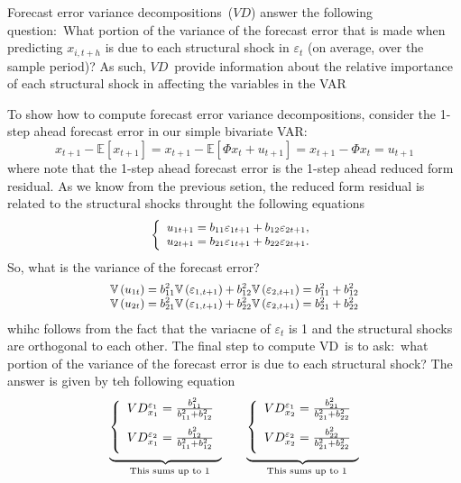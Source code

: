 \documentclass[10pt]{article}
\begin{document}
Forecast error variance decompositions\ ($VD$) answer the following
question:\ What portion of the variance of the forecast error that is made
when predicting $x_{i,t+h}$ is due to each structural shock in $\varepsilon
_{t}$ (on average, over the sample period)? As such, $VD$\ provide
information about the relative importance of each structural shock in
affecting the variables in the VAR

To show how to compute forecast error variance decompositions, consider the
1-step ahead forecast error in our simple bivariate VAR:%
\begin{equation*}
x_{t+1}-\mathbb{E}\left[ x_{t+1}\right] =x_{t+1}-\mathbb{E}\left[ \Phi
x_{t}+u_{t+1}\right] =x_{t+1}-\Phi x_{t}=u_{t+1}
\end{equation*}%
where note that the 1-step ahead forecast error is the 1-step ahead reduced
form residual. As we know from the previous setion, the reduced form
residual is related to the structural shocks throught the following equations%
\begin{equation*}
{\small \left\{ 
\begin{array}{c}
u_{1t+1}=b_{11}\varepsilon _{1t+1}+b_{12}\varepsilon _{2t+1}, \\ 
u_{2t+1}=b_{21}\varepsilon _{1t+1}+b_{22}\varepsilon _{2t+1}.%
\end{array}%
\right. }
\end{equation*}%
So, what is the variance of the forecast error?%
\begin{equation*}
{\small 
\begin{array}{c}
\mathbb{V}\left( u_{1t}\right) =b_{11}^{2}\mathbb{V}\left( \varepsilon
_{1,t+1}\right) +b_{12}^{2}\mathbb{V}\left( \varepsilon _{2,t+1}\right)
=b_{11}^{2}+b_{12}^{2} \\ 
\mathbb{V}\left( u_{2t}\right) =b_{21}^{2}\mathbb{V}\left( \varepsilon
_{1,t+1}\right) +b_{22}^{2}\mathbb{V}\left( \varepsilon _{2,t+1}\right)
=b_{21}^{2}+b_{22}^{2}%
\end{array}%
}
\end{equation*}%
whihc follows from the fact that the variacne of $\varepsilon _{t}$ is 1 and
the structural shocks are orthogonal to each other. The final step to
compute VD\ is to ask:\ what portion of the variance of the forecast error
is due to each structural shock? The answer is given by teh following
equation%
\begin{equation*}
\underset{\text{This sums up to 1}}{\underbrace{\left\{ 
\begin{array}{c}
VD_{x_{1}}^{\varepsilon _{1}}=\frac{b_{11}^{2}}{b_{11}^{2}+b_{12}^{2}}%
\medskip \\ 
VD_{x_{1}}^{\varepsilon _{2}}=\frac{b_{12}^{2}}{b_{11}^{2}+b_{12}^{2}}%
\medskip%
\end{array}%
\right. }}\ \ \ \ \ \ \underset{\text{This sums up to 1}}{\underbrace{%
\left\{ 
\begin{array}{c}
VD_{x_{2}}^{\varepsilon _{1}}=\frac{b_{21}^{2}}{b_{21}^{2}+b_{22}^{2}}%
\medskip \\ 
VD_{x_{2}}^{\varepsilon _{2}}=\frac{b_{22}^{2}}{b_{21}^{2}+b_{22}^{2}}%
\medskip%
\end{array}%
\right. }}
\end{equation*}
\end{document}
